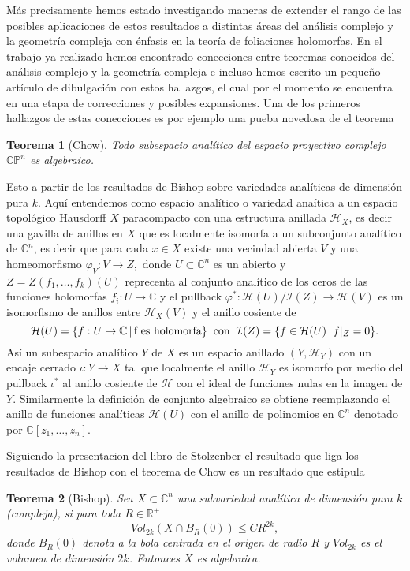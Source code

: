 \documentclass[letterpaper]{report}
\newtheorem{teorema}{Teorema}[chapter]
\newcommand{\co}{\ensuremath{\mathbb C }}
\newcommand{\con}{\ensuremath{\mathbb{C}^n}}
\newcommand{\cp}{\ensuremath{\mathbb{CP}}}
\newcommand{\re}{\ensuremath{\mathbb R }}
\begin{document}
M\'as precisamente hemos estado investigando maneras de extender el rango de las posibles aplicaciones de estos resultados a
distintas \'areas del an\'alisis complejo y la geometr\'ia compleja con \'enfasis en la teor\'ia de foliaciones holomorfas. En el trabajo
ya realizado hemos encontrado conecciones entre teoremas conocidos del an\'alisis complejo y la geometr\'ia compleja e incluso hemos
escrito un pequeño art\'iculo de dibulgaci\'on con estos hallazgos, el cual por el momento se encuentra en una etapa de correcciones
y posibles expansiones. Una de los primeros hallazgos de estas conecciones es por ejemplo una pueba novedosa de el teorema
\begin{teorema}[Chow]\label{Chow}
        Todo subespacio anal\'itico del espacio proyectivo complejo $\cp^{n}$ es algebraico.
\end{teorema}
\noindent Esto a partir de los resultados de Bishop sobre variedades anal\'iticas de dimensi\'on pura $k$. Aqu\'i entendemos como espacio 
anal\'itico o variedad ana\'itica a un espacio topol\'ogico Hausdorff $X$ paracompacto con una estructura anillada $\mathcal{H}_X$, es decir una 
gavilla de anillos en $X$ que es localmente isomorfa a un subconjunto anal\'itico de $\con$, es decir que para cada $x\in X$
existe una vecindad abierta $V$ y una homeomorfismo $\varphi_V:V\rightarrow Z,$ donde $U\subset\con$ es un abierto y $Z=Z(f_1,\dots,f_k)(U)$ reprecenta al 
conjunto anal\'itico de los ceros de las funciones holomorfas $f_i:U\rightarrow\co$ y el pullback $\varphi^{*}:\mathcal{H}(U)/\mathcal{I}(Z)\rightarrow \mathcal{H}(V)$ 
es un isomorfismo de anillos entre $\mathcal{H}_X(V)$ y el anillo cosiente de
\[
        \mathcal{H}(U)=\{f:U\rightarrow\co\,|\,\text{f es holomorfa}\}\hspace{0.2cm}\text{con}\hspace{0.2cm}\mathcal{I}(Z)=\{f\in\mathcal{H}(U)\,|\,f|_{Z}=0\}.
\]
As\'i un subespacio anal\'itico $Y$ de $X$ es un espacio anillado $(Y,\mathcal{H}_Y)$ con un encaje cerrado $\iota:Y\rightarrow X$ tal que localmente el anillo
$\mathcal{H}_Y$ es isomorfo por medio del pullback $\iota^{*}$ al anillo cosiente de $\mathcal{H}$ con el ideal de funciones nulas en la imagen de $Y$. 
Similarmente la definici\'on de conjunto algebraico se obtiene reemplazando el anillo de funciones anal\'iticas $\mathcal{H}(U)$ con el anillo de 
polinomios en $\con$ denotado por $\co[z_1,\dots,z_n]$.

Siguiendo la presentacion del libro de Stolzenber \cite{Stolzenberg} el resultado que liga 
los resultados de Bishop con el teorema de Chow es un resultado que estipula
\begin{teorema}[Bishop]\label{Bishop1}
        Sea $X\subset\con$ una subvariedad anal\'itica de dimensi\'on pura $k$ (compleja), si para toda $R\in\re^+$
        $$Vol_{2k}(X\cap B_R(0))\leq CR^{2k},$$
        donde $B_R(0)$ denota a la bola centrada en el origen de radio $R$ y $Vol_{2k}$ es el volumen de dimensi\'on $2k$. Entonces $X$ es algebraica.
\end{teorema}
\end{document}
